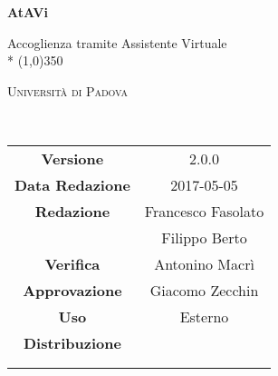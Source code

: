 \documentclass[a4paper,12pt]{article}
\date{2017/05/05}
\begin{document}
	\begin{titlepage}
		\centering
		{\huge\bfseries AtAVi\par}
		Accoglienza tramite Assistente Virtuale \\*
		\line(1,0){350} \\
		{\scshape\LARGE Università di Padova \par}
		\vspace{1cm}
		{\scshape\Large \manualesviluppatoreRA\ \par}
		\logo
		\newpage
		\begin{tabular}{c|c}
			{\hfill \textbf{Versione}} 			& 2.0.0			\\ 
			{\hfill\textbf{Data Redazione}} 	& 2017-05-05 		\\ 
			{\hfill\textbf{Redazione}} 			& Francesco Fasolato \\ & Filippo Berto \\
			{\hfill\textbf{Verifica}} 				& Antonino Macrì \\
			{\hfill\textbf{Approvazione}} 		& Giacomo Zecchin \\
			{\hfill\textbf{Uso}} 						& Esterno 			\\
			{\hfill\textbf{Distribuzione}} 		& \vardanega \\ & \cardin \\ & \prop \\
		\end{tabular}
	\end{titlepage}
	
	\pagestyle{myfront}
	\newpage	
			

	\newpage
		\tableofcontents 	%
	\newpage
		\listoftables 		%
	\newpage	
		\listoffigures		%
	
	\label{LastFrontPage}
		\newpage
		\pagestyle{mymain}
		
		\newpage
		
		\newpage
		
		\newpage
		
		\newpage
		
		\newpage
		
		\newpage
		
		\newpage
		
		\newpage
		
		\newpage
		
		\newpage
		

		\glsaddall	%
		\newpage

			\appendix
			
			\printglossary[style=myaltlistgroup] %

	\label{LastPage}
\end{document}
